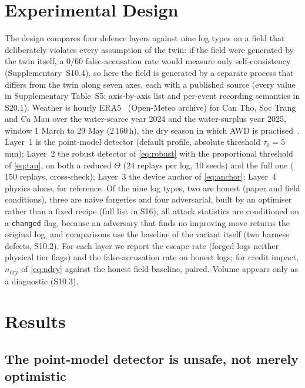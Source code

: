 \section{Experimental Design}
\label{sec:design}

The design compares four defence layers against nine log types on a field that
deliberately violates every assumption of the twin: if the field were generated
by the twin itself, a $0/60$ false-accusation rate would measure only
self-consistency (Supplementary~S10.4), so here the field is generated by a
separate process that
differs from the twin along seven axes, each with a published source (every
value in Supplementary Table~S5; axis-by-axis list and per-event recording
semantics in S20.1). Weather is hourly ERA5~\cite{hersbach2020} (Open-Meteo archive) for Can Tho,
Soc Trang and Ca Mau over the water-scarce year 2024 and the water-surplus year 2025, window
1 March to 29 May ($2\,160$\,h), the dry season in which AWD is
practised~\cite{tuong2003}. Layer~1 is the point-model detector (default profile, absolute
threshold $\tau_0=5$\,mm); Layer~2 the robust detector of \eqref{eq:robust}
with the proportional threshold of \eqref{eq:tau}, on both a reduced
$\Theta$ ($24$ replays per log, $10$ seeds) and the full one ($150$ replays,
cross-check); Layer~3 the device anchor of \eqref{eq:anchor}; Layer~4 physics
alone, for reference. Of the nine log types, two are honest (paper and field conditions), three are naive
forgeries and four adversarial, built by
an optimiser rather than a fixed recipe (full list in S16); all attack
statistics are conditioned on a \texttt{changed} flag, because an adversary
that finds no improving move returns the original log, and comparisons use the
baseline of the variant itself (two harness defects, S10.2). For each layer we
report the escape rate (forged logs neither physical tier flags) and the
false-accusation rate on honest logs; for credit impact, $n_{\mathrm{dry}}$ of
\eqref{eq:ndry} against the honest field baseline, paired. Volume appears only
as a diagnostic (S10.3).

\section{Results}
\label{sec:results}

\subsection{The point-model detector is unsafe, not merely optimistic}

